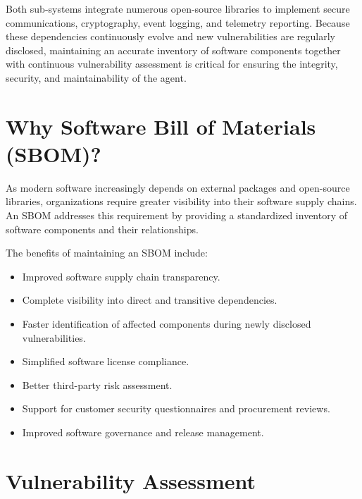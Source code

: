 Both sub-systems integrate numerous open-source libraries to implement secure communications, cryptography, event logging, and telemetry reporting. Because these dependencies continuously evolve and new vulnerabilities are regularly disclosed, maintaining an accurate inventory of software components together with continuous vulnerability assessment is critical for ensuring the integrity, security, and maintainability of the agent.

\vspace{0.4cm}

\section{Why Software Bill of Materials (SBOM)?}

As modern software increasingly depends on external packages and open-source libraries, organizations require greater visibility into their software supply chains. An SBOM addresses this requirement by providing a standardized inventory of software components and their relationships.

The benefits of maintaining an SBOM include:
\begin{itemize}
\item Improved software supply chain transparency.
\item Complete visibility into direct and transitive dependencies.
\item Faster identification of affected components during newly disclosed vulnerabilities.
\item Simplified software license compliance.
\item Better third-party risk assessment.
\item Support for customer security questionnaires and procurement reviews.
\item Improved software governance and release management.
\end{itemize}

\vspace{0.4cm}

\section{Vulnerability Assessment}


